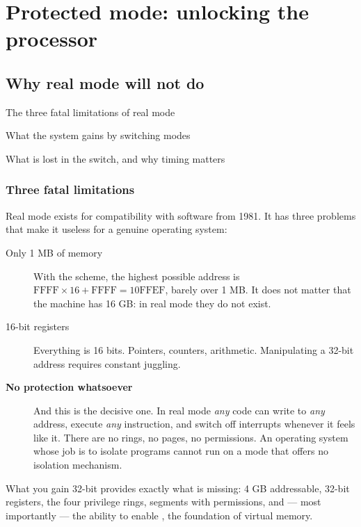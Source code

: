 \part{Protected mode: unlocking the processor}

\chapter{Why real mode will not do}

\begin{goals}
  \item The three fatal limitations of real mode
  \item What the system gains by switching modes
  \item What is lost in the switch, and why timing matters
\end{goals}

\section{Three fatal limitations}

Real mode exists for compatibility with software from 1981. It has three problems that make it
useless for a genuine operating system:

\begin{description}
  \item[Only 1 MB of memory] With the  scheme, the highest possible
    address is $\text{FFFF}\times16+\text{FFFF} = \text{10FFEF}$, barely over 1 MB. It does not
    matter that the machine has 16 GB: in real mode they do not exist.
  \item[16-bit registers] Everything is 16 bits. Pointers, counters, arithmetic. Manipulating a
    32-bit address requires constant juggling.
  \item[\textbf{No protection whatsoever}] And this is the decisive one. In real mode \emph{any}
    code can write to \emph{any} address, execute \emph{any} instruction, and switch off interrupts
    whenever it feels like it. There are no rings, no pages, no permissions. An operating system
    whose job is to isolate programs cannot run on a mode that offers no isolation mechanism.
\end{description}

\begin{concept}{What you gain}
32-bit  provides exactly what is missing: 4 GB addressable, 32-bit registers,
the four privilege rings, segments with permissions, and --- most importantly --- the ability to
enable , the foundation of virtual memory.
\end{concept}

